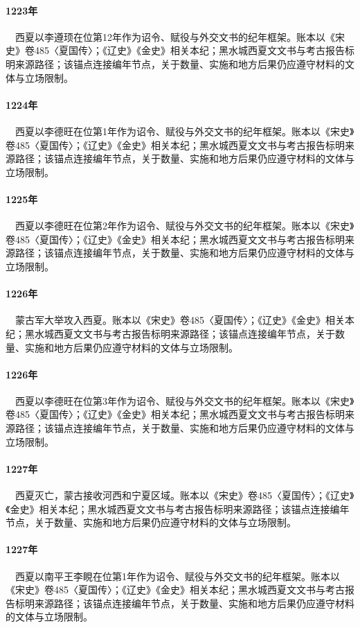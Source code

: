 \paragraph{1223年}　西夏以李遵顼在位第12年作为诏令、赋役与外交文书的纪年框架。账本以《宋史》卷485〈夏国传〉；《辽史》《金史》相关本纪；黑水城西夏文文书与考古报告标明来源路径；该锚点连接编年节点，关于数量、实施和地方后果仍应遵守材料的文体与立场限制。

\paragraph{1224年}　西夏以李德旺在位第1年作为诏令、赋役与外交文书的纪年框架。账本以《宋史》卷485〈夏国传〉；《辽史》《金史》相关本纪；黑水城西夏文文书与考古报告标明来源路径；该锚点连接编年节点，关于数量、实施和地方后果仍应遵守材料的文体与立场限制。

\paragraph{1225年}　西夏以李德旺在位第2年作为诏令、赋役与外交文书的纪年框架。账本以《宋史》卷485〈夏国传〉；《辽史》《金史》相关本纪；黑水城西夏文文书与考古报告标明来源路径；该锚点连接编年节点，关于数量、实施和地方后果仍应遵守材料的文体与立场限制。

\paragraph{1226年}　蒙古军大举攻入西夏。账本以《宋史》卷485〈夏国传〉；《辽史》《金史》相关本纪；黑水城西夏文文书与考古报告标明来源路径；该锚点连接编年节点，关于数量、实施和地方后果仍应遵守材料的文体与立场限制。

\paragraph{1226年}　西夏以李德旺在位第3年作为诏令、赋役与外交文书的纪年框架。账本以《宋史》卷485〈夏国传〉；《辽史》《金史》相关本纪；黑水城西夏文文书与考古报告标明来源路径；该锚点连接编年节点，关于数量、实施和地方后果仍应遵守材料的文体与立场限制。

\paragraph{1227年}　西夏灭亡，蒙古接收河西和宁夏区域。账本以《宋史》卷485〈夏国传〉；《辽史》《金史》相关本纪；黑水城西夏文文书与考古报告标明来源路径；该锚点连接编年节点，关于数量、实施和地方后果仍应遵守材料的文体与立场限制。

\paragraph{1227年}　西夏以南平王李睍在位第1年作为诏令、赋役与外交文书的纪年框架。账本以《宋史》卷485〈夏国传〉；《辽史》《金史》相关本纪；黑水城西夏文文书与考古报告标明来源路径；该锚点连接编年节点，关于数量、实施和地方后果仍应遵守材料的文体与立场限制。
